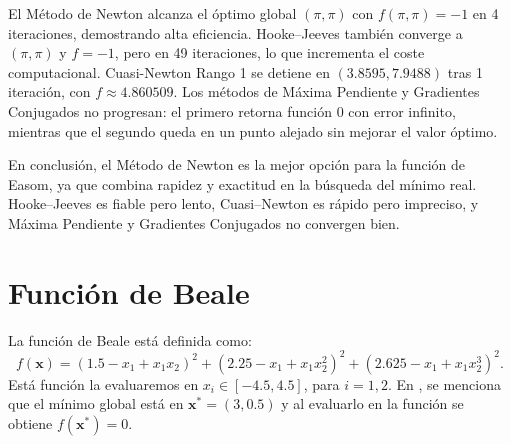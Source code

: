 \newpage

El Método de Newton alcanza el óptimo global $(\pi,\pi)$ con $f(\pi,\pi)=-1$ en 4 iteraciones, demostrando alta eficiencia. Hooke–Jeeves también converge a $(\pi,\pi)$ y $f=-1$, pero en 49 iteraciones, lo que incrementa el coste computacional. Cuasi-Newton Rango 1 se detiene en $(3.8595,7.9488)$ tras 1 iteración, con $f \approx 4.860509$. Los métodos de Máxima Pendiente y Gradientes Conjugados no progresan: el primero retorna función 0 con error infinito, mientras que el segundo queda en un punto alejado sin mejorar el valor óptimo.

En conclusión, el Método de Newton es la mejor opción para la función de Easom, ya que combina rapidez y exactitud en la búsqueda del mínimo real. Hooke–Jeeves es fiable pero lento, Cuasi–Newton es rápido pero impreciso, y Máxima Pendiente y Gradientes Conjugados no convergen bien.

\section{Función de Beale} %

La función de Beale está definida como:
$$f(\mathbf{x}) = (1.5 - x_1 + x_1 x_2)^2 + \left(2.25 - x_1 + x_1 x_2^2\right)^2 + \left(2.625 - x_1 + x_1 x_2^3\right)^2.$$
Está función la evaluaremos en $x_i \in [-4.5, 4.5]$, para $i = 1, 2$. En \citep{sfuoptimization}, se menciona que el mínimo global está en $\mathbf{x}^* = (3, 0.5)$ y al evaluarlo en la función se obtiene $f\left(\mathbf{x}^*\right) = 0$.
\begin{figure}[H]
    \centering
    \caption{}
\end{figure}

